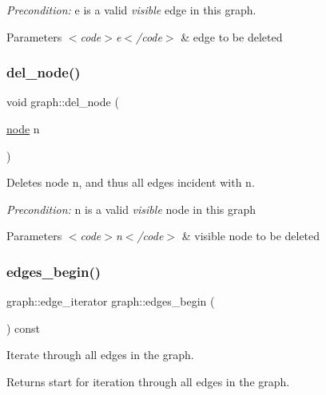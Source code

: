 {\itshape Precondition\+:} {\ttfamily e} is a valid {\itshape visible} edge in this graph.


\begin{DoxyParams}{Parameters}
{\em $<$code$>$e$<$/code$>$} & edge to be deleted \\
\hline
\end{DoxyParams}
\mbox{\label{classgraph_a8bdc09d5b9ac4bd26586b054d8fcbe91}} 
\subsubsection{\texorpdfstring{del\+\_\+node()}{del\_node()}}
{\footnotesize\ttfamily void graph\+::del\+\_\+node (\begin{DoxyParamCaption}\item[{\mbox{\hyperlink{classnode}{node}}}]{n }\end{DoxyParamCaption})}

Deletes node {\ttfamily n}, and thus all edges incident with {\ttfamily n}.

{\itshape Precondition\+:} {\ttfamily n} is a valid {\itshape visible} node in this graph


\begin{DoxyParams}{Parameters}
{\em $<$code$>$n$<$/code$>$} & visible node to be deleted \\
\hline
\end{DoxyParams}
\mbox{\label{classgraph_a7ba35a4c4e8343ffb27ed6d9703c6f18}} 
\subsubsection{\texorpdfstring{edges\+\_\+begin()}{edges\_begin()}}
{\footnotesize\ttfamily graph\+::edge\+\_\+iterator graph\+::edges\+\_\+begin (\begin{DoxyParamCaption}{ }\end{DoxyParamCaption}) const}

Iterate through all edges in the graph.

\begin{DoxyReturn}{Returns}
start for iteration through all edges in the graph. 
\end{DoxyReturn}
\mbox{\label{classgraph_aea8d7f976b85b6137f52d915e26639f6}} 
